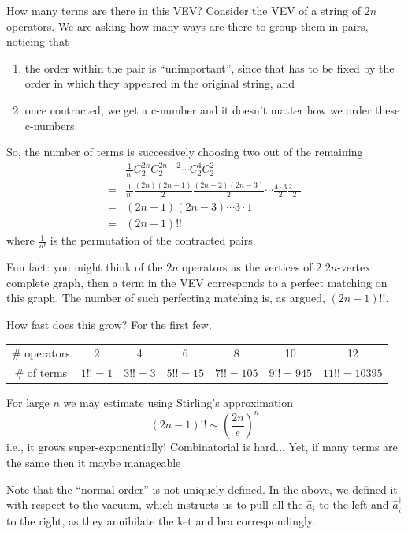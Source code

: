 How many terms are there in this VEV? Consider the VEV of a string of $2n$ operators. We are asking how many ways are there to group them in pairs, noticing that
\begin{enumerate}
    \item the order within the pair is ``unimportant'', since that has to be fixed by the order in which they appeared in the original string, and
    \item once contracted, we get a c-number and it doesn't matter how we order these c-numbers.
\end{enumerate}
So, the number of terms is successively choosing two out of the remaining
\begin{align*}
    &\frac{1}{n!}C_{2}^{2n}C_{2}^{2n-2}\cdots C_{2}^{4}C_{2}^{2}\\
    =&\frac{1}{n!}\frac{\left( 2n \right) \left( 2n-1 \right)}{2}\frac{\left( 2n-2 \right) \left( 2n-3 \right)}{2}\cdots \frac{4\cdot 3}{2}\frac{2\cdot 1}{2}\\
    =&\left( 2n-1 \right) \left( 2n-3 \right) \cdots 3\cdot 1\\
    =&\left( 2n-1 \right) !!
\end{align*}
where $\frac{1}{n!}$ is the permutation of the contracted pairs.

Fun fact: you might think of the $2n$ operators as the vertices of 2 $2n$-vertex complete graph, then a term in the VEV corresponds to a perfect matching on this graph. The number of such perfecting matching is, as argued, $(2n-1)!!$.

How fast does this grow? For the first few,

\begin{table}[h!]
    \centering
    \begin{tabular}{|c|c|c|c|c|c|c|}
        \hline
        \# operators & 2 & 4 & 6 & 8 & 10 & 12\\
        \# of terms & $1!!=1$ & $3!!=3$ & $5!!=15$ & $7!!=105$ & $9!!=945$ & $11!!=10395$\\
        \hline
    \end{tabular}
\end{table}

For large $n$ we may estimate using Stirling's approximation
\[ \left( 2n-1 \right) !!\sim \left( \frac{2n}{e} \right) ^n\]
i.e., it grows super-exponentially! Combinatorial is hard... Yet, if many terms are the same then it maybe manageable

Note that the ``normal order'' is not uniquely defined. In the above, we defined it with respect to the vacuum, which instructs us to pull all the $\hat{a}_i$ to the left and $\hat{a}_i^\dagger$ to the right, as they annihilate the ket and bra correspondingly.

